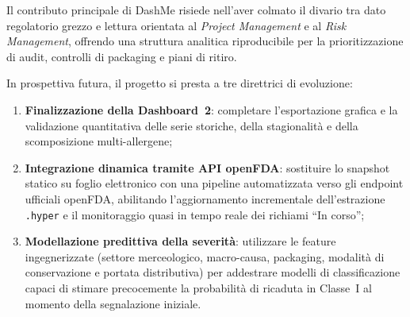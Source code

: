 Il contributo principale di DashMe risiede nell'aver colmato il divario tra dato regolatorio grezzo e lettura orientata al \textit{Project Management} e al \textit{Risk Management}, offrendo una struttura analitica riproducibile per la prioritizzazione di audit, controlli di packaging e piani di ritiro.

In prospettiva futura, il progetto si presta a tre direttrici di evoluzione:
\begin{enumerate}
    \item \textbf{Finalizzazione della Dashboard~2}: completare l'esportazione grafica e la validazione quantitativa delle serie storiche, della stagionalità e della scomposizione multi-allergene;
    \item \textbf{Integrazione dinamica tramite API openFDA}: sostituire lo snapshot statico su foglio elettronico con una pipeline automatizzata verso gli endpoint ufficiali openFDA, abilitando l'aggiornamento incrementale dell'estrazione \texttt{.hyper} e il monitoraggio quasi in tempo reale dei richiami ``In corso'';
    \item \textbf{Modellazione predittiva della severità}: utilizzare le feature ingegnerizzate (settore merceologico, macro-causa, packaging, modalità di conservazione e portata distributiva) per addestrare modelli di classificazione capaci di stimare precocemente la probabilità di ricaduta in Classe~I al momento della segnalazione iniziale.
\end{enumerate}
